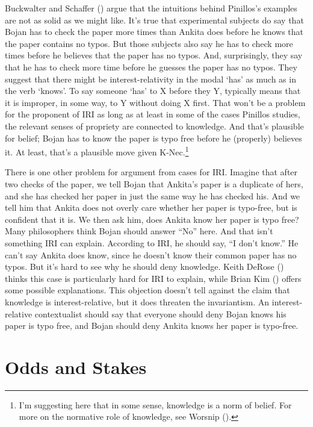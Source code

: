 \documentclass[
  11pt,
  letterpaper,
  DIV=11,
  numbers=noendperiod,
  twoside]{scrartcl}
\begin{document}
Buckwalter and Schaffer ()
argue that the intuitions behind Pinillos's examples are not as solid as
we might like. It's true that experimental subjects do say that Bojan
has to check the paper more times than Ankita does before he knows that
the paper contains no typos. But those subjects also say he has to check
more times before he believes that the paper has no typos. And,
surprisingly, they say that he has to check more time before he guesses
the paper has no typos. They suggest that there might be
interest-relativity in the modal `has' as much as in the verb `knows'.
To say someone `has' to X before they Y, typically means that it is
improper, in some way, to Y without doing X first. That won't be a
problem for the proponent of IRI as long as at least in some of the
cases Pinillos studies, the relevant senses of propriety are connected
to knowledge. And that's plausible for belief; Bojan has to know the
paper is typo free before he (properly) believes it. At least, that's a
plausible move given K-Nec.\footnote{I'm suggesting here that in some
  sense, knowledge is a norm of belief. For more on the normative role
  of knowledge, see Worsnip ().}

There is one other problem for argument from cases for IRI. Imagine that
after two checks of the paper, we tell Bojan that Ankita's paper is a
duplicate of hers, and she has checked her paper in just the same way he
has checked his. And we tell him that Ankita does not overly care
whether her paper is typo-free, but is confident that it is. We then ask
him, does Ankita know her paper is typo free? Many philosophers think
Bojan should answer ``No'' here. And that isn't something IRI can
explain. According to IRI, he should say, ``I don't know.'' He can't say
Ankita does know, since he doesn't know their common paper has no typos.
But it's hard to see why he should deny knowledge. Keith DeRose
() thinks this case is particularly
hard for IRI to explain, while Brian Kim ()
offers some possible explanations. This objection doesn't tell against
the claim that knowledge is interest-relative, but it does threaten the
invariantism. An interest-relative contextualist should say that
everyone should deny Bojan knows his paper is typo free, and Bojan
should deny Ankita knows her paper is typo-free.

\section{Odds and Stakes}\label{oddsandstakes}
\end{document}
